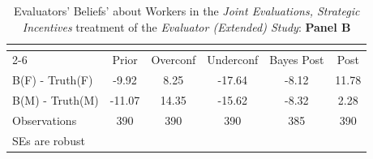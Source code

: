 \begin{table}[htbp]\centering
\caption{Evaluators' Beliefs' about Workers in the \textit{Joint Evaluations, Strategic Incentives} treatment of the \textit{Evaluator (Extended) Study}: \textbf{Panel B}}
\begin{tabular}{l*{5}{c}}
\hline\hline
                &\multicolumn{5}{c}{}                             \\\cmidrule(lr){2-6}
                &\multicolumn{1}{c}{Prior}&\multicolumn{1}{c}{Overconf}&\multicolumn{1}{c}{Underconf}&\multicolumn{1}{c}{Bayes Post}&\multicolumn{1}{c}{Post}\\
\hline
B(F) - Truth(F) &    -9.92&     8.25&   -17.64&    -8.12&    11.78\\
B(M) - Truth(M) &   -11.07&    14.35&   -15.62&    -8.32&     2.28\\
\hline
Observations    &      390&      390&      390&      385&      390\\
\hline\hline
\multicolumn{6}{l}{\footnotesize SEs are robust}\\
\end{tabular}
\end{table}
